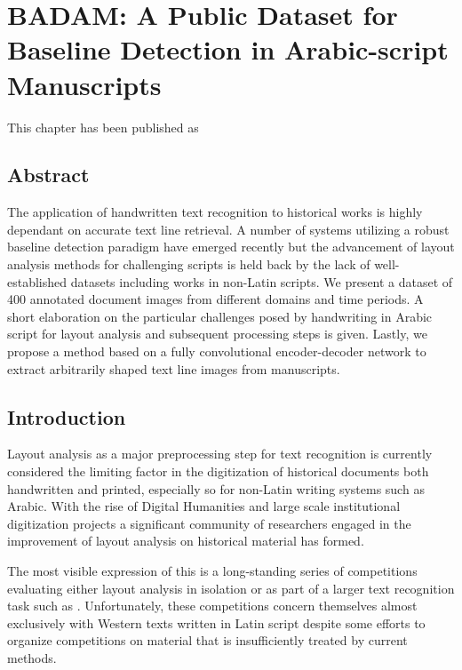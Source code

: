 \chapter{BADAM: A Public Dataset for Baseline Detection in Arabic-script Manuscripts}
\label{ch:hip}
\thispagestyle{empty}
\vfill
This chapter has been published as 

\newpage
\section*{Abstract}
	The application of handwritten text recognition to historical works is
	highly dependant on accurate text line retrieval. A number of systems
	utilizing a robust baseline detection paradigm have emerged recently
	but the advancement of layout analysis methods for challenging scripts
	is held back by the lack of well-established datasets including works
	in non-Latin scripts. We present a dataset of 400 annotated document
	images from different domains and time periods. A short elaboration on
	the particular challenges posed by handwriting in Arabic script for
	layout analysis and subsequent processing steps is given.  Lastly, we
	propose a method based on a fully convolutional encoder-decoder network
	to extract arbitrarily shaped text line images from manuscripts.

\section{Introduction}

Layout analysis as a major preprocessing step for text recognition is currently
considered the limiting factor in the digitization of historical documents both
handwritten and printed, especially so for non-Latin writing systems such as
Arabic. With the rise of Digital Humanities and large scale institutional
digitization projects a significant community of researchers engaged in the
improvement of layout analysis on historical material has formed.

The most visible expression of this is a long-standing series of competitions
evaluating either layout analysis in isolation
\cite{gatos2011icdar2009,antonacopoulos2009icdar,gatos2010icfhr,antonacopoulos2011historical,antonacopoulos2013icdar,murdock2015icdar,diem2017cbad}
or as part of a larger text recognition task such as
\cite{antonacopoulos2015icdar2015}. Unfortunately, these competitions concern
themselves almost exclusively with Western texts written in Latin script
despite some efforts to organize competitions on material that is
insufficiently treated by current methods.

